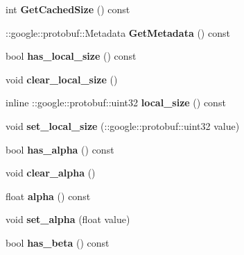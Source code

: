 \begin{DoxyCompactItemize}
int {\bfseries Get\+Cached\+Size} () const
\item 
\mbox{\label{classcaffe_1_1_l_r_n_parameter_ad351dde25e4e7026c6e74f5dce99407d}} 
\+::google\+::protobuf\+::\+Metadata {\bfseries Get\+Metadata} () const
\item 
\mbox{\label{classcaffe_1_1_l_r_n_parameter_a3af2d77147a65168f53b9715226eb1f8}} 
bool {\bfseries has\+\_\+local\+\_\+size} () const
\item 
\mbox{\label{classcaffe_1_1_l_r_n_parameter_af815e75803262e3cb242ef7db94304cd}} 
void {\bfseries clear\+\_\+local\+\_\+size} ()
\item 
\mbox{\label{classcaffe_1_1_l_r_n_parameter_aa9480dc72eae1f96f0752d9da78b2349}} 
inline \+::google\+::protobuf\+::uint32 {\bfseries local\+\_\+size} () const
\item 
\mbox{\label{classcaffe_1_1_l_r_n_parameter_adfdadcec35037f68c65a757c2cc45515}} 
void {\bfseries set\+\_\+local\+\_\+size} (\+::google\+::protobuf\+::uint32 value)
\item 
\mbox{\label{classcaffe_1_1_l_r_n_parameter_acb149d6b0d09be0cf2c50727ffc2b01d}} 
bool {\bfseries has\+\_\+alpha} () const
\item 
\mbox{\label{classcaffe_1_1_l_r_n_parameter_adc42dc97fd64f06e49b74efccc198c94}} 
void {\bfseries clear\+\_\+alpha} ()
\item 
\mbox{\label{classcaffe_1_1_l_r_n_parameter_ac2cd05bec96df4390651fb4d421a787e}} 
float {\bfseries alpha} () const
\item 
\mbox{\label{classcaffe_1_1_l_r_n_parameter_aaffba41d94304f44381dbd7237d12d4b}} 
void {\bfseries set\+\_\+alpha} (float value)
\item 
\mbox{\label{classcaffe_1_1_l_r_n_parameter_af594f68c40332bf41ee5291e1fea9afe}} 
bool {\bfseries has\+\_\+beta} () const

\end{DoxyCompactItemize}
